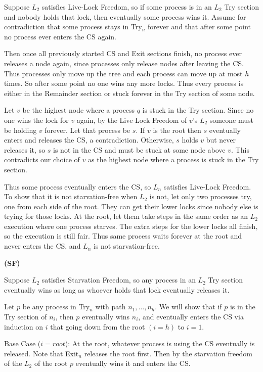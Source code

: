 \documentclass[12pt]{article}
\begin{document}
\begin{solution}
    Suppose $L_2$ satisfies Live-Lock Freedom, so if some process is in an $L_2$ Try section and nobody holds that lock, then eventually some process wins it. Assume for contradiction that some process stays in Try$_n$ forever and that after some point no process ever enters the CS again. 

    Then once all previously started CS and Exit sections finish, no process ever releases a node again, since processes only release nodes after leaving the CS. Thus processes only move up the tree and each process can move up at most $h$ times. So after some point no one wins any more locks. Thus every process is either in the Remainder section or stuck forever in the Try section of some node. 

    Let $v$ be the highest node where a process $q$ is stuck in the Try section. Since no one wins the lock for $v$ again, by the Live Lock Freedom of $v$'s $L_2$ someone must be holding $v$ forever. Let that process be $s$. If $v$ is the root then $s$ eventually enters and releases the CS, a contradiction. Otherwise, $s$ holds $v$ but never releases it, so $s$ is not in the CS and must be stuck at some node above $v$. This contradicts our choice of $v$ as the highest node where a process is stuck in the Try section.

    Thus some process eventually enters the CS, so $L_n$ satisfies Live-Lock Freedom. 
    To show that it is not starvation-free when $L_2$ is not, let only two processes try, one from each side of the root. They can get their lower locks since nobody else is trying for those locks. At the root, let them take steps in the same order as an $L_2$ execution where one process starves. The extra steps for the lower locks all finish, so the execution is still fair. Thus same process waits forever at the root and never enters the CS, and $L_n$ is not starvation-free. 


    \bbni
    \textbf{(SF)} 
    
    
    Suppose $L_2$ satisfies Starvation Freedom, so any process in an $L_2$ Try section eventually wins as long as whoever holds that lock eventually releases it. 

    Let $p$ be any process in Try$_n$ with path $n_1, \ldots, n_h$. We will show that if $p$ is in the Try section of $n_i$, then $p$ eventually wins $n_i$, and eventually enters the CS via induction on $i$ that going down from the root $(i = h)$ to $i=1$. 

    Base Case ($i=root$): At the root, whatever process is using the CS eventually is released. Note that Exit$_n$ releases the root first. Then by the starvation freedom of the $L_2$ of the root $p$ eventually wins it and enters the CS. 
    

\end{solution}
\end{document}
